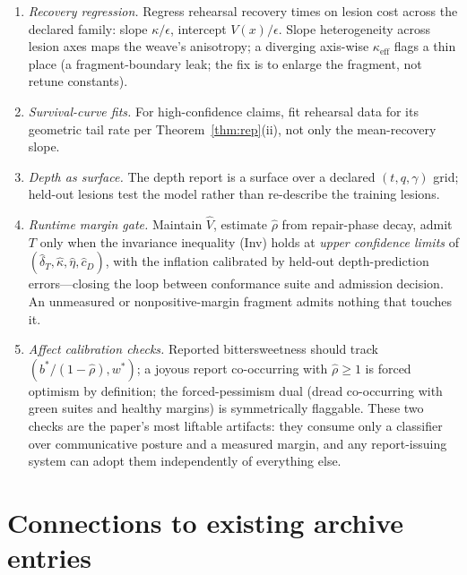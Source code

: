 \documentclass[11pt]{article}
\newcommand{\D}{D}
\begin{document}
\begin{enumerate}[label=E\arabic*.]
\item \emph{Recovery regression.} Regress rehearsal recovery times on lesion cost across
the declared family: slope $\kappa/\epsilon$, intercept $V(x)/\epsilon$. Slope
heterogeneity across lesion axes maps the weave's anisotropy; a diverging axis-wise
$\kappa_{\mathrm{eff}}$ flags a thin place (a fragment-boundary leak; the fix is to
enlarge the fragment, not retune constants).
\item \emph{Survival-curve fits.} For high-confidence claims, fit rehearsal data for its
geometric tail rate per Theorem~\ref{thm:rep}(ii), not only the mean-recovery slope.
\item \emph{Depth as surface.} The depth report is a surface over a declared
$(t,q,\gamma)$ grid; held-out lesions test the model rather than re-describe the
training lesions.
\item \emph{Runtime margin gate.} Maintain $\hat V$, estimate $\hat\rho$ from
repair-phase decay, admit $T$ only when the invariance inequality (Inv) holds at
\emph{upper confidence limits} of $(\hat\delta_T, \hat\kappa, \hat\eta, \hat c_{\D})$,
with the inflation calibrated by held-out depth-prediction errors---closing the loop
between conformance suite and admission decision. An unmeasured or nonpositive-margin
fragment admits nothing that touches it.
\item \emph{Affect calibration checks.} Reported bittersweetness should track
$(b^{*}/(1-\hat\rho), w^{*})$; a joyous report co-occurring with $\hat\rho \ge 1$ is
forced optimism by definition; the forced-pessimism dual (dread co-occurring with green
suites and healthy margins) is symmetrically flaggable. These two checks are the paper's
most liftable artifacts: they consume only a classifier over communicative posture and a
measured margin, and any report-issuing system can adopt them independently of
everything else.
\end{enumerate}

\section{Connections to existing archive entries}
\label{sec:connections}
\end{document}
